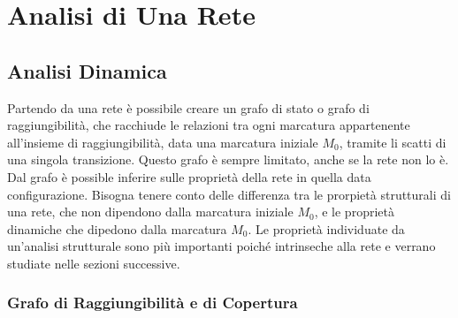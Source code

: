 \documentclass{article}
\numberwithin{equation}{subsection}
\begin{document}
\clearpage

\section{Analisi di Una Rete}

\subsection{Analisi Dinamica}

Partendo da una rete è possibile creare un grafo di stato o grafo di raggiungibilità, che racchiude le relazioni tra ogni marcatura appartenente all'insieme di raggiungibilità, 
data una marcatura iniziale $M_0$, tramite li scatti di una singola transizione. Questo grafo è sempre limitato, anche se la rete non lo è. Dal grafo è possible inferire sulle 
proprietà della rete in quella data configurazione. 
Bisogna tenere conto delle differenza tra le prorpietà strutturali di una rete, che non dipendono dalla marcatura iniziale $M_0$, e le proprietà dinamiche che dipedono dalla 
marcatura $M_0$. Le proprietà individuate da un'analisi strutturale sono più importanti poiché intrinseche alla rete e verrano studiate nelle sezioni successive. 

\subsubsection{Grafo di Raggiungibilità e di Copertura}
\end{document}

